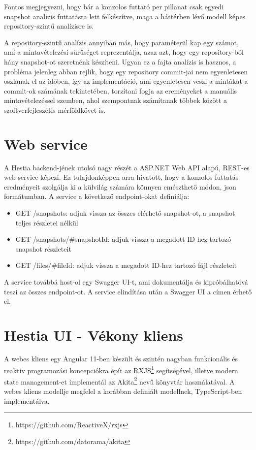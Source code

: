 Fontos megjegyezni, hogy bár a konzolos futtató per pillanat csak egyedi snapshot analízis futtatásra lett felkészítve, maga a háttérben lévő modell képes repository-szintű analízisre is.

A repository-szintű analízis annyiban más, hogy paraméterül kap egy számot, ami a mintavételezési sűrűséget reprezentálja, azaz azt, hogy egy repository-ból hány snapshot-ot szeretnénk készíteni. Ugyan ez a fajta analízis is hasznos, a probléma jelenleg abban rejlik, hogy egy repository commit-jai nem egyenletesen oszlanak el az időben, így az implementáció, ami egyenletesen veszi a mintákat a commit-ok számának tekintetében, torzítani fogja az ereményeket a manuális mintavételezéssel szemben, ahol szempontnak számítanak többek között a szoftverfejleszétis mérföldkövet is.

\section{Web service}

A Hestia backend-jének utolsó nagy részét a ASP.NET Web API alapú, REST-es web service képezi. Ez tulajdonképpen arra hivatott, hogy a konzolos futtatás eredményeit szolgálja ki a külvilág számára könnyen emészthető módon, json formátumban. A service a következő endpoint-okat definiálja:
\begin{itemize}
    \item GET /snapshots: adjuk vissza az összes elérhető snapshot-ot, a snapshot teljes részletei nélkül
    \item GET /snapshots/\#snapshotId: adjuk vissza a megadott ID-hez tartozó snapshot részleteit
    \item GET /files/\#fileId: adjuk vissza a megadott ID-hez tartozó fájl részleteit
\end{itemize}

A service továbbá host-ol egy Swagger UI-t, ami dokumentálja és kipróbálhatóvá teszi az összes endpoint-ot. A service elindítása után a Swagger UI a  címen érhető el.

\section{Hestia UI - Vékony kliens}

A webes kliens egy Angular 11-ben készült és szintén nagyban funkcionális és reaktív programozási koncepciókra épít az RXJS\footnote{https://github.com/ReactiveX/rxjs} segítségével, illetve modern state management-et implementál az Akita\footnote{https://github.com/datorama/akita} nevű könyvtár használatával. A webes kliens modellje megfelel a korábban definiált modellnek, TypeScript-ben implementálva.

